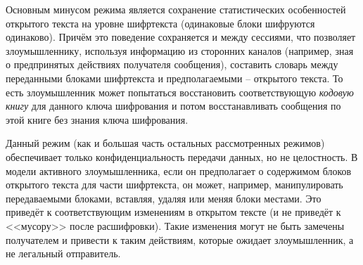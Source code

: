 Основным минусом режима является сохранение статистических особенностей открытого текста на уровне шифртекста (одинаковые блоки шифруются одинаково). Причём это поведение сохраняется и между сессиями, что позволяет злоумышленнику, используя информацию из сторонних каналов (например, зная о предпринятых действиях получателя сообщения), составить словарь между переданными блоками шифртекста и предполагаемыми -- открытого текста. То есть злоумышленник может попытаться восстановить соответствующую \emph{кодовую книгу} для данного ключа шифрования и потом восстанавливать сообщения по этой книге без знания ключа шифрования.

Данный режим (как и большая часть остальных рассмотренных режимов) обеспечивает только конфиденциальность передачи данных, но не целостность. В модели активного злоумышленника, если он предполагает о содержимом блоков открытого текста для части шифртекста, он может, например, манипулировать передаваемыми блоками, вставляя, удаляя или меняя блоки местами. Это приведёт к соответствующим изменениям в открытом тексте (и не приведёт к <<мусору>> после расшифровки). Такие изменения могут не быть замечены получателем и привести к таким действиям, которые ожидает злоумышленник, а не легальный отправитель.
